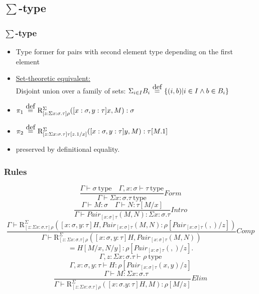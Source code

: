 \documentclass[aspectratio=169]{beamer}
\newcommand{\typ}{\ \mathrm{type}}
\newcommand{\pair}[2]{Pair_{[x:\sigma]\tau}(#1, #2)}
\newcommand{\R}[2]{\mathrm{R}_{[z:\Sigma x:\sigma.\tau]\rho}^{\Sigma}(#1, #2)}
\newcommand{\C}{Comp}
\newcommand{\Intro}{Intro}
\newcommand{\F}{Form}
\newcommand{\E}{Elim}
\newcommand\defeq{\stackrel{\mathclap{\normalfont\mbox{def}}}{\ =\ }}
\newcommand{\Gamdash}{\Gamma\vdash}
\begin{document}
    \subsection{$\sum$-type}
    \begin{frame}
        \frametitle{$\sum$-type}
        \begin{itemize}
            \item Type former for pairs with second element type depending on the first element
            \item \underline{Set-theoretic equivalent:}\\
            Disjoint union over a family of sets: $\Sigma_{i\in I}B_i \defeq \{(i,b)|i \in I \wedge b \in B_i\}$
            \item $\pi_1 \defeq \R{[x:\sigma,y:\tau]x}{M}:\sigma$
            \item $\pi_2 \defeq \mathrm{R}^\Sigma_{[z:\Sigma x:\sigma.\tau]\tau[z.1/x]}([x:\sigma,y:\tau]y, M):\tau[M.1]$
            \item preserved by definitional equality.
        \end{itemize}
    \end{frame}
    \begin{frame}
        \frametitle{Rules}
        $$\frac{\Gamma \vdash \sigma \typ \quad \Gamma,x:\sigma\vdash \tau \typ}{\Gamdash \Sigma x:\sigma.\tau \typ}\F$$
        $$\frac{\Gamma \vdash M : \sigma\quad \Gamma \vdash N : \tau[M/x]}{\Gamma \vdash \pair{M}{N} : \Sigma x:\sigma.\tau}\Intro$$
        $$\frac{\Gamma \vdash \R{[x:\sigma,y:\tau]H}{\pair{M}{N}:\rho[\pair{}{}/z]}}{\Gamma \vdash \R{[x:\sigma,y:\tau]H}{\pair{M}{N}}}\C$$
        $$=H[M/x,N/y]:\rho[\pair{}{}/z].$$
        $$\Gamma,z:\Sigma x:\sigma.\tau \vdash \rho \typ$$
        $$\Gamma,x:\sigma,y:\tau\vdash H:\rho [\pair{x}{y}/z]$$
        $$\frac{\quad \Gamma \vdash M : \Sigma x:\sigma.\tau}{\Gamma \vdash \R{[x:\sigma.y:\tau]H}{M}:\rho[M/z]}\E$$
    \end{frame}
\end{document}
